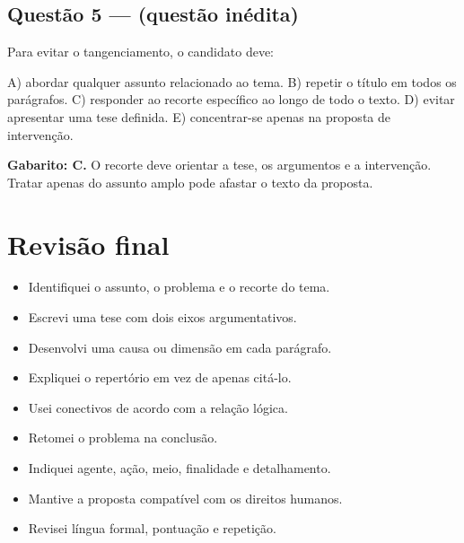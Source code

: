 \documentclass[11pt,a4paper]{article}
\begin{document}
\subsection*{Questão 5 — (questão inédita)}

Para evitar o tangenciamento, o candidato deve:

A) abordar qualquer assunto relacionado ao tema. B) repetir o título em todos os parágrafos. C) responder ao recorte específico ao longo de todo o texto. D) evitar apresentar uma tese definida. E) concentrar-se apenas na proposta de intervenção.

\begin{alerta}
\textbf{Gabarito: C.} O recorte deve orientar a tese, os argumentos e a intervenção. Tratar apenas do assunto amplo pode afastar o texto da proposta.
\end{alerta}

\section*{Revisão final}

\begin{itemize}
  \item[$\square$] Identifiquei o assunto, o problema e o recorte do tema.
  \item[$\square$] Escrevi uma tese com dois eixos argumentativos.
  \item[$\square$] Desenvolvi uma causa ou dimensão em cada parágrafo.
  \item[$\square$] Expliquei o repertório em vez de apenas citá-lo.
  \item[$\square$] Usei conectivos de acordo com a relação lógica.
  \item[$\square$] Retomei o problema na conclusão.
  \item[$\square$] Indiquei agente, ação, meio, finalidade e detalhamento.
  \item[$\square$] Mantive a proposta compatível com os direitos humanos.
  \item[$\square$] Revisei língua formal, pontuação e repetição.
\end{itemize}
\end{document}

